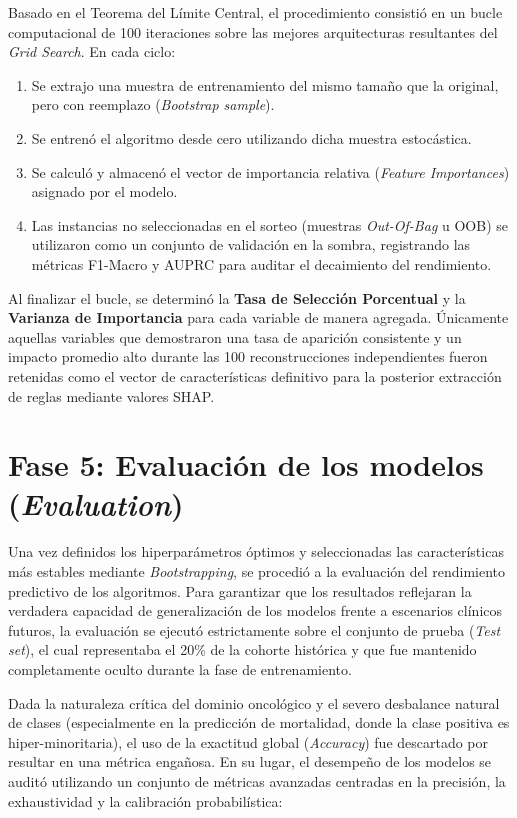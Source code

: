 Basado en el Teorema del Límite Central, el procedimiento consistió en un bucle computacional de 100 iteraciones sobre las mejores arquitecturas resultantes del \textit{Grid Search}. En cada ciclo:
\begin{enumerate}
    \item Se extrajo una muestra de entrenamiento del mismo tamaño que la original, pero con reemplazo (\textit{Bootstrap sample}).
    \item Se entrenó el algoritmo desde cero utilizando dicha muestra estocástica.
    \item Se calculó y almacenó el vector de importancia relativa (\textit{Feature Importances}) asignado por el modelo.
    \item Las instancias no seleccionadas en el sorteo (muestras \textit{Out-Of-Bag} u OOB) se utilizaron como un conjunto de validación en la sombra, registrando las métricas F1-Macro y AUPRC para auditar el decaimiento del rendimiento.
\end{enumerate}

Al finalizar el bucle, se determinó la \textbf{Tasa de Selección Porcentual} y la \textbf{Varianza de Importancia} para cada variable de manera agregada. Únicamente aquellas variables que demostraron una tasa de aparición consistente y un impacto promedio alto durante las 100 reconstrucciones independientes fueron retenidas como el vector de características definitivo para la posterior extracción de reglas mediante valores SHAP.


\section{Fase 5: Evaluación de los modelos (\textit{Evaluation})}
\label{sec:evaluacion}

Una vez definidos los hiperparámetros óptimos y seleccionadas las características más estables mediante \textit{Bootstrapping}, se procedió a la evaluación del rendimiento predictivo de los algoritmos. Para garantizar que los resultados reflejaran la verdadera capacidad de generalización de los modelos frente a escenarios clínicos futuros, la evaluación se ejecutó estrictamente sobre el conjunto de prueba (\textit{Test set}), el cual representaba el 20\% de la cohorte histórica y que fue mantenido completamente oculto durante la fase de entrenamiento.

Dada la naturaleza crítica del dominio oncológico y el severo desbalance natural de clases (especialmente en la predicción de mortalidad, donde la clase positiva es hiper-minoritaria), el uso de la exactitud global (\textit{Accuracy}) fue descartado por resultar en una métrica engañosa. En su lugar, el desempeño de los modelos se auditó utilizando un conjunto de métricas avanzadas centradas en la precisión, la exhaustividad y la calibración probabilística:

